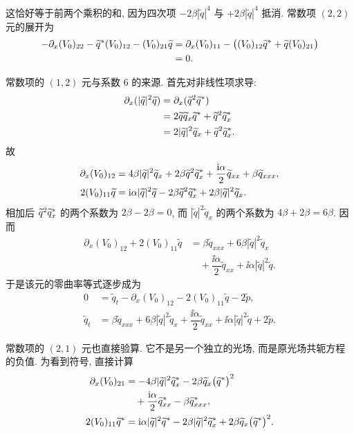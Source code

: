 这恰好等于前两个乘积的和, 因为四次项 $-2\beta|\widetilde q|^4$ 与 $+2\beta|\widetilde q|^4$ 抵消. 常数项 $(2,2)$ 元的展开为
\begin{align*}
-\partial_x(V_0)_{22}
-{\widetilde q}^{*}(V_0)_{12}-(V_0)_{21}\widetilde q
&=\partial_x(V_0)_{11}
-\bigl((V_0)_{12}{\widetilde q}^{*}
+\widetilde q(V_0)_{21}\bigr)\\
&=0.
\end{align*}
\par\smallskip\noindent 常数项的 $(1,2)$ 元与系数 6 的来源.\quad
首先对非线性项求导:
\begin{align*}
\partial_x(|\widetilde q|^2\widetilde q)
&=\partial_x(\widetilde q^2{\widetilde q}^{*})\\
&=2\widetilde q\widetilde q_x{\widetilde q}^{*}
+\widetilde q^2{\widetilde q_x}^{*}\\
&=2|\widetilde q|^2\widetilde q_x
+\widetilde q^2{\widetilde q_x}^{*}.
\end{align*}
故
\begin{align*}
\partial_x(V_0)_{12}
&=4\beta|\widetilde q|^2\widetilde q_x
+2\beta\widetilde q^2{\widetilde q_x}^{*}
+\dfrac{\mathrm{i}\alpha}{2}\widetilde q_{xx}
+\beta\widetilde q_{xxx},\\
2(V_0)_{11}\widetilde q
&=\mathrm{i}\alpha|\widetilde q|^2\widetilde q
-2\beta\widetilde q^2{\widetilde q_x}^{*}
+2\beta|\widetilde q|^2\widetilde q_x.
\end{align*}
相加后 $\widetilde q^2{\widetilde q_x}^{*}$ 的两个系数为 $2\beta-2\beta=0$, 而 $|\widetilde q|^2\widetilde q_x$ 的两个系数为 $4\beta+2\beta=6\beta$. 因而
\begin{align*}
\partial_x(V_0)_{12}+2(V_0)_{11}\widetilde q
&=\beta\widetilde q_{xxx}
+6\beta|\widetilde q|^2\widetilde q_x\\
&\quad+\dfrac{\ii\alpha}{2}\widetilde q_{xx}
+\ii\alpha|\widetilde q|^2\widetilde q.
\end{align*}
于是该元的零曲率等式逐步成为
\begin{align*}
0&=\widetilde q_t-\partial_x(V_0)_{12}
-2(V_0)_{11}\widetilde q-2\widetilde p,\\
\widetilde q_t
&=\beta\widetilde q_{xxx}
+6\beta|\widetilde q|^2\widetilde q_x
+\dfrac{\ii\alpha}{2}\widetilde q_{xx}
+\ii\alpha|\widetilde q|^2\widetilde q+2\widetilde p.
\end{align*}
\par\smallskip\noindent 常数项的 $(2,1)$ 元也直接验算.\quad
它不是另一个独立的光场, 而是原光场共轭方程的负值. 为看到符号, 直接计算
\begin{align*}
\partial_x(V_0)_{21}
&=-4\beta|\widetilde q|^2{\widetilde q_x}^{*}
-2\beta\widetilde q_x\bigl({\widetilde q}^{*}\bigr)^2\\
&\quad+\dfrac{\mathrm{i}\alpha}{2}{\widetilde q_{xx}}^{*}
-\beta{\widetilde q_{xxx}}^{*},\\
2(V_0)_{11}{\widetilde q}^{*}
&=\mathrm{i}\alpha|\widetilde q|^2{\widetilde q}^{*}
-2\beta|\widetilde q|^2{\widetilde q_x}^{*}
+2\beta\widetilde q_x\bigl({\widetilde q}^{*}\bigr)^2.
\end{align*}

